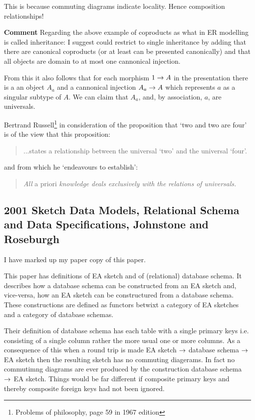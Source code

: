 \documentclass[10pt,a4paper]{scrartcl}
\newcommand{\displaybibentry}[1]
{\begin{framed}
\bibentry{#1}
\end{framed}
}
\begin{document}
This is because commuting diagrams indicate locality. Hence composition relationships!

\textbf{Comment}
Regarding the above example of coproducts as what in ER modelling is called inheritance: I suggest could restrict to single inheritance by adding that
there are canonical coproducts (or at least can be presented canonically) and that all objects are domain to at most
one cannonical injection. 

From this it also follows that for each  morphism $1 \rightarrow A$ in the presentation there is a an object
$A_a$ and a cannonical injection $A_a \rightarrow A$ which represents $a$ as a singular subtype of $A$. We can claim that
$A_a$, and, by association, $a$, are universals. 

Bertrand Russell\footnote{Problems of philosophy, page 59 in 1967 edition} in consideration of the proposition
that `two and two are four' is of the view that this proposition:
\begin{quote}
...states a relationship between the universal `two' and the universal `four'.
\end{quote}
and from which he `endeavours to establish':
\begin{quote}
\textit{All} a priori \textit{knowledge deals exclusively with the relations of universals.}
\end{quote}

\subsection{2001 Sketch Data Models, Relational Schema and Data Specifications, Johnstone and Roseburgh }
\displaybibentry{johnson2001}
I have marked up my paper copy of this paper.

This paper has definitions of EA sketch and of (relational) database schema.
It describes how a database schema can be constructed from an EA sketch and, vice-versa, how an EA sketch can be constructured from a database schema. These constructions are defined as functors betwixt a category of EA sketches and a category of database schemas.

Their definition of database schema has each table with a single primary keys i.e. consisting of a single column rather the more usual one or more columns. As a consequence of this when a round trip is made  
EA sketch $\rightarrow$ database schema $\rightarrow$ EA sketch then the resulting sketch has no commuting diagerams.
In fact no commutimng diagrams are ever produced by the construction  database schema $\rightarrow$ EA sketch.
Things would be far different if composite primary keys and thereby composite foreign keys 
had not been ignored.
\end{document}
